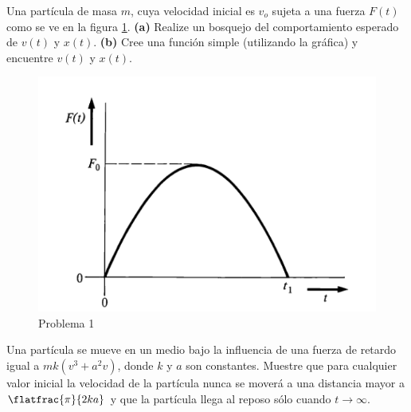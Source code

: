 \begin{mdframed}[style=warning]
	\begin{ejercicio}
		Una partícula de masa $m$, cuya velocidad inicial es $v_o$ sujeta a una fuerza $F(t)$ como se ve en la figura \ref{ej1}. \textbf{(a)} Realize un bosquejo del comportamiento esperado de $v(t)$ y $x(t)$. \textbf{(b)} Cree una función simple (utilizando la gráfica) y encuentre $v(t)$ y $x(t)$.
		\begin{figure}[H]
			\centering
			\includegraphics[scale=0.3]{img/ej1.png}
			\caption{Problema 1}
			\label{ej1}
		\end{figure}
	\end{ejercicio}
\end{mdframed}



\begin{mdframed}[style=warning]
	\begin{ejercicio}
		Una partícula se mueve en un medio bajo la influencia de una fuerza de retardo igual a $mk(v^3 + a^2 v)$, donde $k$ y $a$ son constantes. Muestre que para cualquier valor inicial la velocidad de la partícula nunca se moverá a una distancia mayor a $\flatfrac{\pi}{2ka}$ y que la partícula llega al reposo sólo cuando $t\to \infty$.
	\end{ejercicio}
\end{mdframed}

